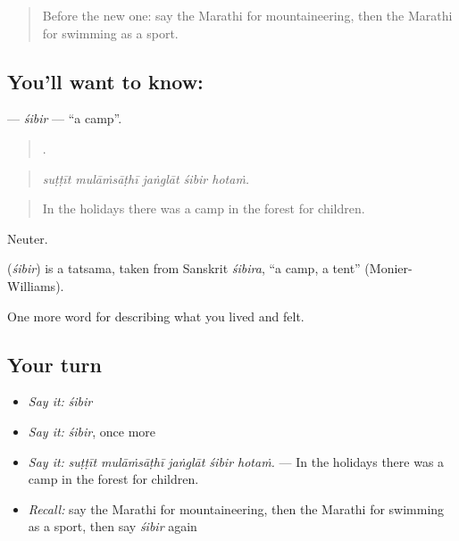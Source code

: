 \label{lesson:MR-C534-sibir}



\begin{quote}
Before the new one: say the Marathi for mountaineering, then the Marathi for swimming as a sport.
\end{quote}

\subsection*{You'll want to know: }
\textbf{} — \emph{śibir} — \textquotedblleft{}a camp\textquotedblright{}.

\begin{quote}
    .
\end{quote}

\begin{quote}
\emph{suṭṭīt mulāṁsāṭhī jaṅglāt śibir hotaṁ.}
\end{quote}

\begin{quote}
In the holidays there was a camp in the forest for children.
\end{quote}

Neuter.

\begin{cousinweb}
\textbf{} (\emph{śibir}) is a tatsama, taken from Sanskrit \emph{śibira}, \textquotedblleft{}a camp, a tent\textquotedblright{} (Monier-Williams).
\end{cousinweb}

\begin{grammarlens}[title={What you've built}]
One more word for describing what you lived and felt.
\end{grammarlens}

\subsection*{Your turn}
\begin{itemize}
\raggedright
  \item \emph{Say it:} \emph{śibir}
  \item \emph{Say it:} \emph{śibir}, once more
  \item \emph{Say it:} \emph{suṭṭīt mulāṁsāṭhī jaṅglāt śibir hotaṁ.} — In the holidays there was a camp in the forest for children.
  \item \emph{Recall:} say the Marathi for mountaineering, then the Marathi for swimming as a sport, then say \emph{śibir} again
\end{itemize}

